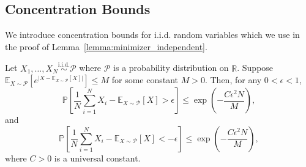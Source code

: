 \subsection{Concentration Bounds}
We introduce concentration bounds for i.i.d. random variables which we use in the proof of Lemma~\ref{lemma:minimizer_independent}.
\begin{lemma}\label{lemma:independent_concentration}
Let $X_1, \dots, X_N \overset{\mathrm{i.i.d.}}{\sim} \mathcal{P}$ where $\mathcal{P}$ is a probability distribution on $\mathbb{R}$. Suppose $\mathbb{E}_{X \sim \mathcal{P}}\left[e^{|X - \mathbb{E}_{X \sim \mathcal{P}}[X]|}\right]\leq M$ for some constant $M>0$. Then, for any $0<\epsilon<1$, 
\begin{equation*}
    \mathbb{P} \left [ \frac{1}{N} \sum_{i=1}^N X_i - \mathbb{E}_{X\sim \mathcal{P}}[X] > \epsilon \right] 
    \leq \exp\left ( -\frac{C \epsilon^2 N}{M} \right ),
\end{equation*}
and
\begin{equation*}
    \mathbb{P} \left [ \frac{1}{N} \sum_{i=1}^N X_i - \mathbb{E}_{X\sim \mathcal{P}}[X] < -\epsilon \right] 
    \leq \exp\left ( -\frac{C \epsilon^2 N}{M} \right ),
\end{equation*}
where $C >0$ is a universal constant.
\end{lemma}
